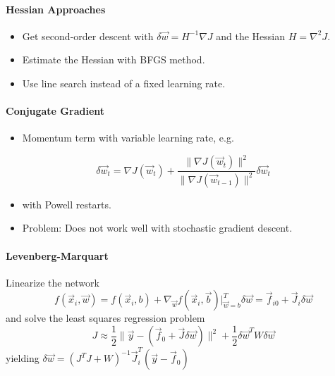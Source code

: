 			\paragraph{Hessian Approaches}
				\begin{itemize}
					\item Get second-order descent with \( \delta\vec{w} = H^{-1} \nabla J \) and the Hessian \( H = \nabla^2 J \).
					\item Estimate the Hessian with BFGS method.
					\item Use line search instead of a fixed learning rate.
				\end{itemize}

			\paragraph{Conjugate Gradient}
				\begin{itemize}
					\item Momentum term with variable learning rate, e.g.
				\end{itemize}
				\begin{equation}
					\delta\vec{w}_t = \nabla J(\vec{w}_t) + \frac{\lVert \nabla J(\vec{w}_t) \rVert ^2}{\lVert \nabla J(\vec{w}_{t - 1}) \rVert^2} \delta\vec{w}_{t}
				\end{equation}
				\begin{itemize}
					\item[] with Powell restarts.
					\item Problem: Does not work well with stochastic gradient descent.
				\end{itemize}

			\paragraph{Levenberg-Marquart}
				Linearize the network
				\begin{equation}
					f(\vec{x}_i, \vec{w}) = f(\vec{x}_i, b) + \nabla_{\vec{w}} f(\vec{x}_i, \vec{b}) \big\vert_{\vec{w} = b}^T \delta\vec{w} = \vec{f}_{i0} + \vec{J}_i \delta\vec{w}
				\end{equation}
				and solve the least squares regression problem
				\begin{equation}
					J \approx \frac{1}{2} \lVert \vec{y} - (\vec{f}_0 + \vec{J} \delta\vec{w}) \rVert^2 + \frac{1}{2} \delta\vec{w}^T W \delta\vec{w}
				\end{equation}
				yielding \( \delta\vec{w} = (J^T J + W)^{-1} \vec{J}_i^T (\vec{y} - \vec{f}_0) \)
				
